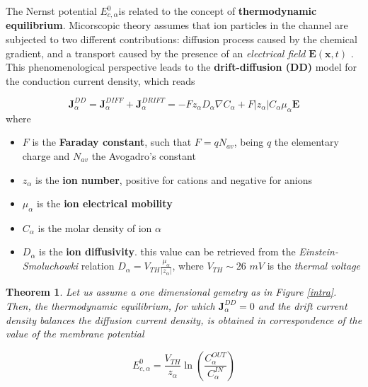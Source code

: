 \documentclass[12pt, a4paper]{report}
\newtheorem{theorem}{Theorem}[section]
\begin{document}
The Nernst potential $E_{c,\alpha}^0$is related to the concept of  \textbf{thermodynamic equilibrium}. Micorscopic theory assumes that ion particles in the channel are subjected to two different contributions: diffusion process caused by the chemical gradient, and a transport caused by the presence of an \textit{electrical field} $\textbf{E}(\textbf{x},t)$ \cite{35}.%
 This phenomenological perspective leads to the \textbf{drift-diffusion (DD)} model for the conduction current density, which reads

\begin{equation}
\textbf{J}_{\alpha}^{DD} = \textbf{J}_{\alpha}^{DIFF} + \textbf{J}_{\alpha}^{DRIFT} = -Fz_{\alpha}D_{\alpha}\nabla C_{\alpha} + F|z_{\alpha}| C_{\alpha}\mu_{\alpha}\textbf{E}
\label{DD}
\end{equation}
where 
\begin{itemize}
	
	\item $F$ is the \textbf{Faraday constant}, such that $F = q N_{av}$, being $q$ the elementary charge and $N_{av}$ the Avogadro's constant
	
	\item $z_{\alpha}$ is the \textbf{ion number}, positive for cations and negative for anions
	
	\item $\mu_{\alpha}$ is the \textbf{ion electrical mobility}
	
	\item $C_{\alpha}$ is the molar density of ion $\alpha$
	
	\item $D_{\alpha}$ is the \textbf{ion diffusivity}. this value can be retrieved from the \textit{Einstein-Smoluchowki} relation \cite{36} %
	 $D_{\alpha} = V_{TH}\frac{\mu_{\alpha}}{|z_{\alpha}|}$, where $ V_{TH} \sim 26$ $mV$ is the \textit{thermal voltage}
\end{itemize}

\begin{theorem}
	Let us assume a one dimensional gemetry as in Figure \ref{intra}. Then, the thermodynamic equilibrium, for which $\textbf{J}_{\alpha}^{DD} = 0$ and  the drift current density balances the diffusion current density, is obtained in correspondence of the value of the membrane potential
	
	\begin{equation}
	E_{c,\alpha}^0 = \frac{V_{TH}}{z_{\alpha}}\ln\left(\frac{C_{\alpha}^{OUT}}{C_{\alpha}^{IN}}\right)
	\end{equation}	
	
	
\end{theorem}
\end{document}
